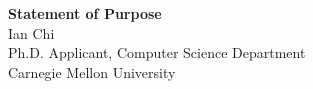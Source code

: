 \documentclass[11pt]{article}
\begin{document}
\begin{center}
    {\Large \textbf{Statement of Purpose}}\\[4pt]
    {\large Ian Chi}\\[2pt]
    Ph.D. Applicant, Computer Science Department\\
    Carnegie Mellon University
\end{center}

\vspace{1em}

\end{document}
